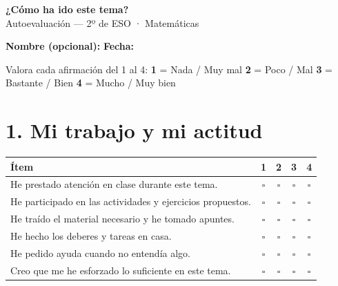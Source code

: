 \documentclass[12pt,a4paper]{article}
\begin{document}
\begin{center}
    {\LARGE \textbf{¿Cómo ha ido este tema?}}\\[0.4em]
    {\large Autoevaluación --- 2º de ESO · Matemáticas}
\end{center}

\vspace{0.5em}
\noindent\textbf{Nombre (opcional):} \underline{\hspace{6cm}} \hfill
\textbf{Fecha:} \underline{\hspace{3cm}}

\vspace{0.8em}
\noindent Valora cada afirmación del 1 al 4:\quad
\textbf{1} = Nada / Muy mal \quad
\textbf{2} = Poco / Mal \quad
\textbf{3} = Bastante / Bien \quad
\textbf{4} = Mucho / Muy bien

\vspace{1em}

\section*{1. Mi trabajo y mi actitud}

\begin{tabularx}{\textwidth}{Xcccc}
\toprule
\rowcolor{headerblue}
\textbf{Ítem} & \textbf{1} & \textbf{2} & \textbf{3} & \textbf{4} \\
\midrule
He prestado atención en clase durante este tema. & $\square$ & $\square$ & $\square$ & $\square$ \\[5pt]
He participado en las actividades y ejercicios propuestos. & $\square$ & $\square$ & $\square$ & $\square$ \\[5pt]
He traído el material necesario y he tomado apuntes. & $\square$ & $\square$ & $\square$ & $\square$ \\[5pt]
He hecho los deberes y tareas en casa. & $\square$ & $\square$ & $\square$ & $\square$ \\[5pt]
He pedido ayuda cuando no entendía algo. & $\square$ & $\square$ & $\square$ & $\square$ \\[5pt]
Creo que me he esforzado lo suficiente en este tema. & $\square$ & $\square$ & $\square$ & $\square$ \\
\bottomrule
\end{tabularx}

\vspace{1em}
\end{document}
